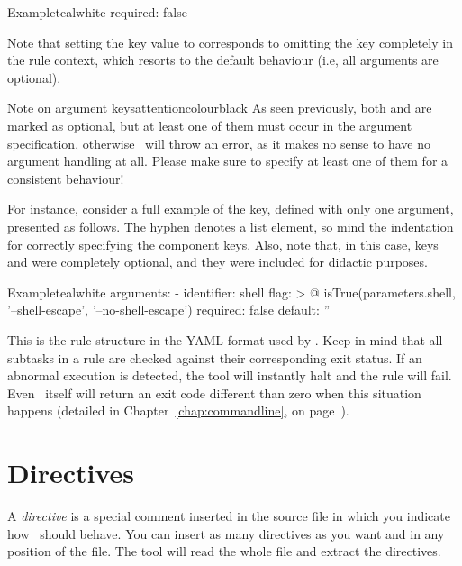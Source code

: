 \begin{description}
\begin{description}
\begin{codebox}{Example}{teal}{\icnote}{white}
required: false
\end{codebox}

Note that setting the  key value to  corresponds to omitting the key completely in the rule context, which resorts to the default behaviour (i.e, all arguments are optional).
\end{description}

\begin{messagebox}{Note on argument keys}{attentioncolour}{\icattention}{black}
As seen previously, both  and  are marked as optional, but at least one of them must occur in the argument specification, otherwise \arara\ will throw an error, as it makes no sense to have no argument handling at all. Please make sure to specify at least one of them for a consistent behaviour!
\end{messagebox}

For instance, consider a full example of the  key, defined with only one argument, presented as follows. The hyphen denotes a list element, so mind the indentation for correctly specifying the component keys. Also, note that, in this case, keys  and  were completely optional, and they were included for didactic purposes.

\begin{codebox}{Example}{teal}{\icnote}{white}
arguments:
- identifier: shell
  flag: >
    @{
        isTrue(parameters.shell,
               '--shell-escape',
               '--no-shell-escape')
    }
  required: false
  default: ''
\end{codebox}
\end{description}

This is the rule structure in the \gls{YAML} format used by \arara. Keep in mind that all subtasks in a rule are checked against their corresponding exit status. If an abnormal execution is detected, the tool will instantly halt and the rule will fail. Even \arara\ itself will return an exit code different than zero when this situation happens (detailed in Chapter~\ref{chap:commandline}, on page~\pageref{chap:commandline}).

\section{Directives}
\label{sec:directives}

A \emph{directive} is a special comment inserted in the source file in which you indicate how \arara\ should behave. You can insert as many directives as you want and in any position of the file. The tool will read the whole file and extract the directives.

